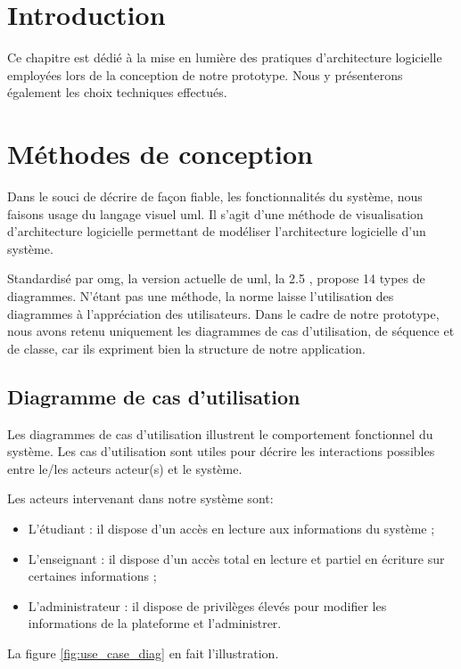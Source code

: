 \section*{Introduction}
Ce chapitre est dédié à la mise en lumière des pratiques d’architecture logicielle 
employées lors de la conception de notre prototype. 
Nous y présenterons également les choix techniques effectués.

\section{Méthodes de conception}
Dans le souci de décrire de façon fiable, les fonctionnalités du système, nous faisons usage du langage visuel \acrfull{uml}. 
Il s’agit d’une méthode de visualisation d’architecture logicielle permettant de modéliser 
l’architecture logicielle d’un système.

Standardisé par \acrshort{omg}, la version actuelle de \acrshort{uml}, la 2.5 \cite{uml_spec_link}, propose 14 types de diagrammes. 
N'étant pas une méthode, la norme laisse l’utilisation des diagrammes à l'appréciation des utilisateurs.
Dans le cadre de notre prototype, nous avons retenu uniquement les diagrammes de cas d’utilisation, 
de séquence et de classe, car ils expriment bien la structure de notre application.

\subsection{Diagramme de cas d’utilisation}
Les diagrammes de cas d’utilisation illustrent le comportement fonctionnel du système. 
Les cas d’utilisation sont utiles pour décrire les interactions possibles entre 
le/les acteurs acteur(s) et le système.
 
Les acteurs intervenant dans notre système sont:

\begin{itemize}
  \item L’étudiant : il dispose d’un accès en lecture aux informations du système ;
  \item L’enseignant : il dispose d’un accès total en lecture et partiel en écriture sur certaines informations ;
  \item L’administrateur : il dispose de privilèges élevés pour modifier les informations de la plateforme et l’administrer.
\end{itemize}

La figure \ref{fig:use_case_diag} en fait l'illustration.

